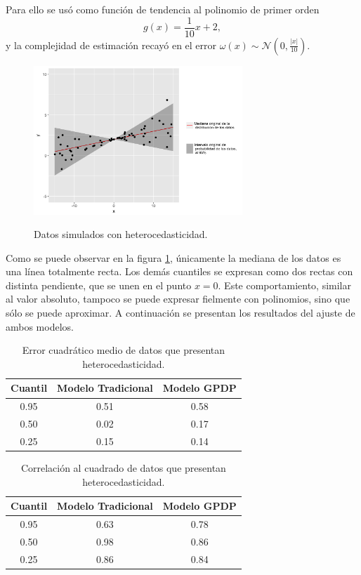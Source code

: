 Para ello se us\'o como funci\'on de tendencia al polinomio de primer orden 
\begin{equation*}
    g(x) = \frac{1}{10}x + 2,
\end{equation*}
y la complejidad de estimaci\'on recay\'o en el error $\omega(x) \sim \mathcal{N}\left(0,\frac{|x|}{10}\right)$. 

\begin{figure}[H]
	\centering
	\caption{Datos simulados con heterocedasticidad.}
	\includegraphics[width=0.7\textwidth]{Figures/Simulation/heteroscedasticity/sample.png}
	\label{sample_heteroscedasticity}
\end{figure}

Como se puede observar en la figura \ref{sample_heteroscedasticity}, \'unicamente la mediana de los datos es una l\'inea totalmente recta. Los dem\'as cuantiles se expresan como dos rectas con distinta pendiente, que se unen en el punto $x = 0$. Este comportamiento, similar al valor absoluto, tampoco se puede expresar fielmente con polinomios, sino que s\'olo se puede aproximar. A continuaci\'on se presentan los resultados del ajuste de ambos modelos.

\begin{table}[H]
\centering
\caption{Error cuadrático medio de datos que presentan heterocedasticidad.} 
\begin{tabular}{ccc}
  \hline
Cuantil & Modelo Tradicional & Modelo GPDP \\ 
  \hline
0.95 & 0.51 & 0.58 \\ 
  0.50 & 0.02 & 0.17 \\ 
  0.25 & 0.15 & 0.14 \\ 
   \hline
\end{tabular}
\label{mse_heteroscedasticity}
\end{table}

\begin{table}[H]
\centering
\caption{Correlación al cuadrado de datos que presentan heterocedasticidad.} 
\begin{tabular}{ccc}
  \hline
Cuantil & Modelo Tradicional & Modelo GPDP \\ 
  \hline
0.95 & 0.63 & 0.78 \\ 
  0.50 & 0.98 & 0.86 \\ 
  0.25 & 0.86 & 0.84 \\ 
   \hline
\end{tabular}
\label{corr_heteroscedasticity}
\end{table}

